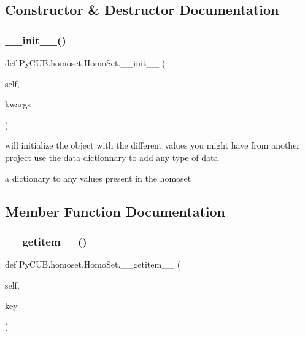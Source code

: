 \subsection{Constructor \& Destructor Documentation}
\mbox{\label{class_py_c_u_b_1_1homoset_1_1_homo_set_adbe4d9e4087fe5b53d861476c011329d}} 
\subsubsection{\texorpdfstring{\+\_\+\+\_\+init\+\_\+\+\_\+()}{\_\_init\_\_()}}
{\footnotesize\ttfamily def Py\+C\+U\+B.\+homoset.\+Homo\+Set.\+\_\+\+\_\+init\+\_\+\+\_\+ (\begin{DoxyParamCaption}\item[{}]{self,  }\item[{}]{kwargs }\end{DoxyParamCaption})}



will initialize the object with the different values you might have from another project use the data dictionnary to add any type of data 

a dictionary to any values present in the homoset 

\subsection{Member Function Documentation}
\mbox{\label{class_py_c_u_b_1_1homoset_1_1_homo_set_ab7ac33ea3033b440816e179cb4a5e3c0}} 
\subsubsection{\texorpdfstring{\+\_\+\+\_\+getitem\+\_\+\+\_\+()}{\_\_getitem\_\_()}}
{\footnotesize\ttfamily def Py\+C\+U\+B.\+homoset.\+Homo\+Set.\+\_\+\+\_\+getitem\+\_\+\+\_\+ (\begin{DoxyParamCaption}\item[{}]{self,  }\item[{}]{key }\end{DoxyParamCaption})}




